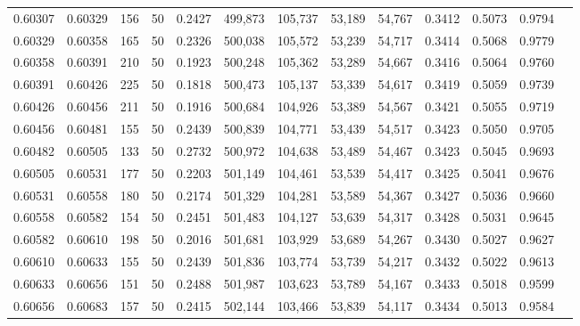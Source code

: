 \begin{tabular}{rrrrrrrrrrrrr}
0.60307 & 0.60329 &   156 &  50 &                                     0.2427 & 499,873 & 105,737 &  53,189 &  54,767 & 0.3412 & 0.5073 & 0.9794 \\
0.60329 & 0.60358 &   165 &  50 &                                     0.2326 & 500,038 & 105,572 &  53,239 &  54,717 & 0.3414 & 0.5068 & 0.9779 \\
0.60358 & 0.60391 &   210 &  50 &                                     0.1923 & 500,248 & 105,362 &  53,289 &  54,667 & 0.3416 & 0.5064 & 0.9760 \\
0.60391 & 0.60426 &   225 &  50 &                                     0.1818 & 500,473 & 105,137 &  53,339 &  54,617 & 0.3419 & 0.5059 & 0.9739 \\
0.60426 & 0.60456 &   211 &  50 &                                     0.1916 & 500,684 & 104,926 &  53,389 &  54,567 & 0.3421 & 0.5055 & 0.9719 \\
0.60456 & 0.60481 &   155 &  50 &                                     0.2439 & 500,839 & 104,771 &  53,439 &  54,517 & 0.3423 & 0.5050 & 0.9705 \\
0.60482 & 0.60505 &   133 &  50 &                                     0.2732 & 500,972 & 104,638 &  53,489 &  54,467 & 0.3423 & 0.5045 & 0.9693 \\
0.60505 & 0.60531 &   177 &  50 &                                     0.2203 & 501,149 & 104,461 &  53,539 &  54,417 & 0.3425 & 0.5041 & 0.9676 \\
0.60531 & 0.60558 &   180 &  50 &                                     0.2174 & 501,329 & 104,281 &  53,589 &  54,367 & 0.3427 & 0.5036 & 0.9660 \\
0.60558 & 0.60582 &   154 &  50 &                                     0.2451 & 501,483 & 104,127 &  53,639 &  54,317 & 0.3428 & 0.5031 & 0.9645 \\
0.60582 & 0.60610 &   198 &  50 &                                     0.2016 & 501,681 & 103,929 &  53,689 &  54,267 & 0.3430 & 0.5027 & 0.9627 \\
0.60610 & 0.60633 &   155 &  50 &                                     0.2439 & 501,836 & 103,774 &  53,739 &  54,217 & 0.3432 & 0.5022 & 0.9613 \\
0.60633 & 0.60656 &   151 &  50 &                                     0.2488 & 501,987 & 103,623 &  53,789 &  54,167 & 0.3433 & 0.5018 & 0.9599 \\
0.60656 & 0.60683 &   157 &  50 &                                     0.2415 & 502,144 & 103,466 &  53,839 &  54,117 & 0.3434 & 0.5013 & 0.9584 \\

\end{tabular}
